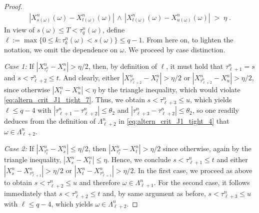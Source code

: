 \documentclass[11pt]{article}
\theoremstyle{definition}\newtheorem{example}[theorem]{Example}
\theoremstyle{definition}\newtheorem{counterexample}[theorem]{Counterexample}
\theoremstyle{definition}\newtheorem{remark}[theorem]{Remark}
\theoremstyle{definition}\newtheorem{defi}[theorem]{Definition}
\numberwithin{equation}{section}
\renewcommand{\|}{\; : \, \;}											%
\begin{document}
\begin{proof}
	\begin{align}\label{eq:altern_crit_J1_tight_7}
		|X^n_{s(\omega)}(\omega)-X^n_{t(\omega)}(\omega)| \, \wedge \, |X^n_{t(\omega)}(\omega)-X^n_{u(\omega)}(\omega)| \; > \;  \eta\; .
	\end{align}
	In view of $s(\omega)\le T < \tau^n_q(\omega)$, define $\ell:= \operatorname{max}\{0 \le k : \tau^n_k(\omega) < s(\omega)\} \le q-1$. From here on, to lighten the notation, we omit the dependence on $\omega$. We proceed by case distinction.
	
\emph{Case 1:} If $|X^n_{\tau^n_\ell}-X^n_s|>\eta/2$, then, by definition of $\ell$, it must hold that $\tau^n_{\ell+1}=s$ and $s<\tau^n_{\ell+2} \le t$. And clearly, either $|X^n_{\tau^n_{\ell+2}}-X^n_t|> \eta/2$ or $|X^n_{\tau^n_{\ell+2}}-X^n_u|> \eta/2$, since otherwise $|X^n_t-X^n_u|< \eta$ by the triangle inequality, which would violate \eqref{eq:altern_crit_J1_tight_7}. Thus, we obtain $s<\tau^n_{\ell+3}\le u$, which yields $\ell\le q-4$ with $|\tau_{\ell+1}^n -\tau_{\ell+2}^n| \leq \theta_2 $ and $|\tau_{\ell+3}^n -\tau_{\ell+2}^n| \leq \theta_2 $, so one readily deduces from the definition of $\Lambda^n_{\ell+2}$ in \eqref{eq:altern_crit_J1_tight_4} that $\omega \in \Lambda^n_{\ell+2}$.

\emph{Case 2:} If $|X^n_{\tau^n_\ell}-X^n_s|\le \eta/2$, then $|X^n_{\tau^n_\ell}- X^n_t| > \eta/2$ since otherwise, again by the triangle inequality, $|X^n_s- X^n_t|\le \eta$. Hence, we conclude $s<\tau^n_{\ell+1}\le t$ and either $|X^n_s- X^n_{\tau^n_{\ell+1}}|> \eta/2$ or $|X^n_t- X^n_{\tau^n_{\ell+1}}|> \eta/2$. In the first case, we proceed as above to obtain $s<\tau^n_{\ell+2}\le u$ and therefore $\omega \in \Lambda^n_{\ell+1}$. For the second case, it follows immediately that $s<\tau^n_{\ell+2}\le t$ and, by same argument as before, $s<\tau^n_{\ell+3}\le u$ with $\ell\le q-4$, which yields $\omega \in \Lambda^n_{\ell+2}$.
\end{proof}
\end{document}
